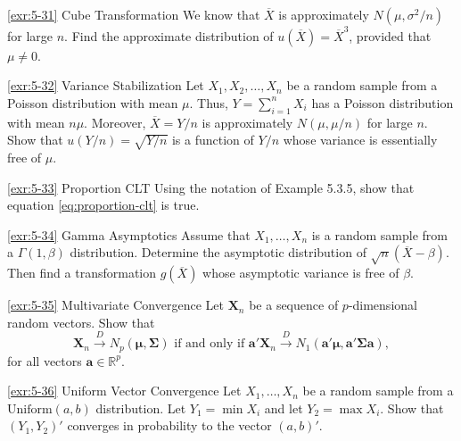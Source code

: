 \begin{exercise}{\ref{exr:5-31} Cube Transformation}\label{exr:5-31}
We know that $\overline{X}$ is approximately $N(\mu, \sigma^2/n)$ for large $n$. Find the approximate distribution of $u(\overline{X}) = \overline{X}^3$, provided that $\mu \neq 0$.
\end{exercise}

\begin{exercise}{\ref{exr:5-32} Variance Stabilization}\label{exr:5-32}
Let $X_1, X_2, \ldots, X_n$ be a random sample from a Poisson distribution with mean $\mu$. Thus, $Y = \sum_{i=1}^n X_i$ has a Poisson distribution with mean $n\mu$. Moreover, $\overline{X} = Y/n$ is approximately $N(\mu, \mu/n)$ for large $n$. Show that $u(Y/n) = \sqrt{Y/n}$ is a function of $Y/n$ whose variance is essentially free of $\mu$.
\end{exercise}

\begin{exercise}{\ref{exr:5-33} Proportion CLT}\label{exr:5-33}
Using the notation of Example 5.3.5, show that equation \eqref{eq:proportion-clt} is true.
\end{exercise}

\begin{exercise}{\ref{exr:5-34} Gamma Asymptotics}\label{exr:5-34}
Assume that $X_1, \ldots, X_n$ is a random sample from a $\Gamma(1,\beta)$ distribution. Determine the asymptotic distribution of $\sqrt{n}(\overline{X} - \beta)$. Then find a transformation $g(\overline{X})$ whose asymptotic variance is free of $\beta$.
\end{exercise}

\begin{exercise}{\ref{exr:5-35} Multivariate Convergence}\label{exr:5-35}
Let ${\mathbf{X}_n}$ be a sequence of $p$-dimensional random vectors. Show that
\[
\mathbf{X}_n \xrightarrow{D} N_p(\boldsymbol{\mu}, \boldsymbol{\Sigma}) \text{ if and only if } \mathbf{a}'\mathbf{X}_n \xrightarrow{D} N_1(\mathbf{a}'\boldsymbol{\mu}, \mathbf{a}'\boldsymbol{\Sigma}\mathbf{a}),
\]
for all vectors $\mathbf{a} \in \mathbb{R}^p$.
\end{exercise}

\begin{exercise}{\ref{exr:5-36} Uniform Vector Convergence}\label{exr:5-36}
Let $X_1, \ldots, X_n$ be a random sample from a $\mathrm{Uniform}(a,b)$ distribution. Let $Y_1 = \min X_i$ and let $Y_2 = \max X_i$. Show that $(Y_1, Y_2)'$ converges in probability to the vector $(a,b)'$.
\end{exercise}

